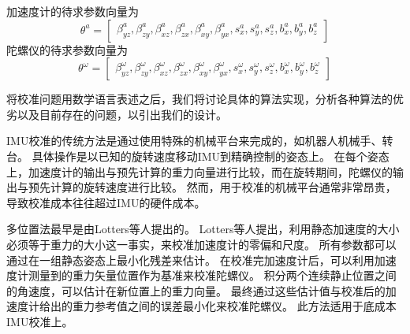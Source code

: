 \documentclass[
  type=master
]{gdutthesis}
\begin{document}
加速度计的待求参数向量为
\begin{equation}
	\theta^a = 
	\begin{bmatrix}
		\beta_{yz}^a,\beta_{zy}^a,\beta_{xz}^a,\beta_{zx}^a,\beta_{xy}^a, \beta_{yx}^a,s_x^a,s_y^a,s_z^a,b_x^a,b_y^a,b_z^a
	\end{bmatrix}
\end{equation}
陀螺仪的待求参数向量为
\begin{equation}
	\theta^\omega = 
	\begin{bmatrix}
		\beta_{yz}^\omega,\beta_{zy}^\omega,\beta_{xz}^\omega,\beta_{zx}^\omega,\beta_{xy}^\omega, \beta_{yx}^\omega,s_x^\omega,s_y^\omega,s_z^\omega,b_x^\omega,b_y^\omega,b_z^\omega
	\end{bmatrix}
\end{equation}

将校准问题用数学语言表述之后，我们将讨论具体的算法实现，分析各种算法的优劣以及目前存在的问题，以引出我们的设计。

IMU校准的传统方法是通过使用特殊的机械平台来完成的，如机器人机械手、转台。
具体操作是以已知的旋转速度移动IMU到精确控制的姿态上\cite{hall2000case}。
在每个姿态上，加速度计的输出与预先计算的重力向量进行比较，而在旋转期间，陀螺仪的输出与预先计算的旋转速度进行比较。
然而，用于校准的机械平台通常非常昂贵，导致校准成本往往超过IMU的硬件成本。

多位置法最早是由Lotters等人提出的\cite{lotters1998procedure}。
Lotters等人提出，利用静态加速度的大小必须等于重力的大小这一事实，来校准加速度计的零偏和尺度。
所有参数都可以通过在一组静态姿态上最小化残差来估计。
在校准完加速度计后，可以利用加速度计测量到的重力矢量位置作为基准来校准陀螺仪。
积分两个连续静止位置之间的角速度，可以估计在新位置上的重力向量。
最终通过这些估计值与校准后的加速度计给出的重力参考值之间的误差最小化来校准陀螺仪。
此方法适用于底成本IMU校准上。
\end{document}
